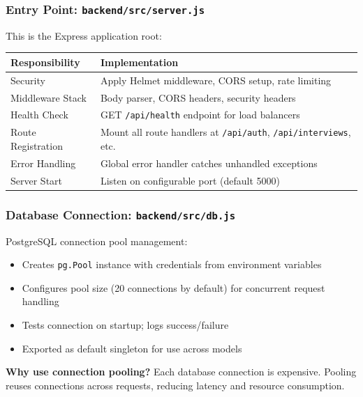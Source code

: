 \documentclass[12pt,a4paper,oneside]{article}
\newcommand{\fileref}[1]{\texttt{#1}}
\begin{document}
\subsubsection{Entry Point: \fileref{backend/src/server.js}}

This is the Express application root:

\begin{table}[H]
\centering
\begin{tabular}{|p{3cm}|p{11cm}|}
\hline
\textbf{Responsibility} & \textbf{Implementation} \\
\hline
Security & Apply Helmet middleware, CORS setup, rate limiting \\
\hline
Middleware Stack & Body parser, CORS headers, security headers \\
\hline
Health Check & GET \texttt{/api/health} endpoint for load balancers \\
\hline
Route Registration & Mount all route handlers at \texttt{/api/auth}, \texttt{/api/interviews}, etc. \\
\hline
Error Handling & Global error handler catches unhandled exceptions \\
\hline
Server Start & Listen on configurable port (default 5000) \\
\hline
\end{tabular}
\end{table}

\subsubsection{Database Connection: \fileref{backend/src/db.js}}

PostgreSQL connection pool management:

\begin{itemize}
    \item Creates \texttt{pg.Pool} instance with credentials from environment variables
    \item Configures pool size (20 connections by default) for concurrent request handling
    \item Tests connection on startup; logs success/failure
    \item Exported as default singleton for use across models
\end{itemize}

\textbf{Why use connection pooling?} Each database connection is expensive. Pooling reuses connections across requests, reducing latency and resource consumption.
\end{document}
